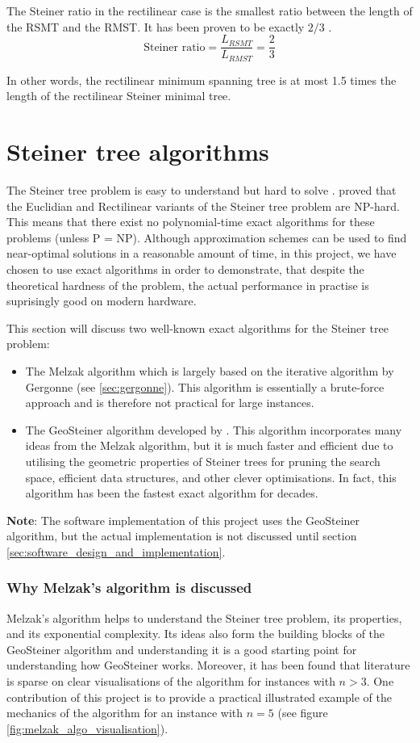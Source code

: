 \documentclass{l4proj}
\begin{document}
The Steiner ratio in the rectilinear case is the smallest ratio between the length of the RSMT and the RMST. It has been proven to be exactly $2/3$ \cite{Brazil2015}.
$$
    \text{Steiner ratio} = \frac{L_{RSMT}}{L_{RMST}} = \frac{2}{3}
$$

In other words, the rectilinear minimum spanning tree is at most 1.5 times the length of the rectilinear Steiner minimal tree.

\section{Steiner tree algorithms}
\label{sec:algorithms}
The Steiner tree problem is easy to understand but hard to solve \citep{Brazil2015}. \cite{Garey1977} proved that the Euclidian and Rectilinear variants of the Steiner tree problem are NP-hard. This means that there exist no polynomial-time exact algorithms for these problems (unless P = NP).
Although approximation schemes can be used to find near-optimal solutions in a reasonable amount of time, in this project, we have chosen to use exact algorithms in order to demonstrate, that despite the theoretical hardness of the problem, the actual performance in practise is suprisingly good on modern hardware.

This section will discuss two well-known exact algorithms for the Steiner tree problem:
\begin{itemize}
    \item The Melzak algorithm \cite{MelzakAlgo} which is largely based on the iterative algorithm by Gergonne \citep{Brazil2014} (see \ref{sec:gergonne}). This algorithm is essentially a brute-force approach and is therefore not practical for large instances.
    \item The GeoSteiner algorithm developed by \cite{geosteiner96}. This algorithm incorporates many ideas from the Melzak algorithm, but it is much faster and efficient due to utilising the geometric properties of Steiner trees for pruning the search space, efficient data structures, and other clever optimisations. In fact, this algorithm has been the fastest exact algorithm for decades.
\end{itemize}
\textbf{Note}: The software implementation of this project uses the GeoSteiner algorithm, but the actual implementation is not discussed until section \ref{sec:software_design_and_implementation}.

\subsubsection{Why Melzak's algorithm is discussed}
Melzak's algorithm helps to understand the Steiner tree problem, its properties, and its exponential complexity. Its ideas also form the building blocks of the GeoSteiner algorithm and understanding it is a good starting point for understanding how GeoSteiner works. Moreover, it has been found that literature is sparse on clear visualisations of the algorithm for instances with $n>3$. One contribution of this project is to provide a practical illustrated example of the mechanics of the algorithm for an instance with $n=5$ (see figure \ref{fig:melzak_algo_visualisation}).
\end{document}
